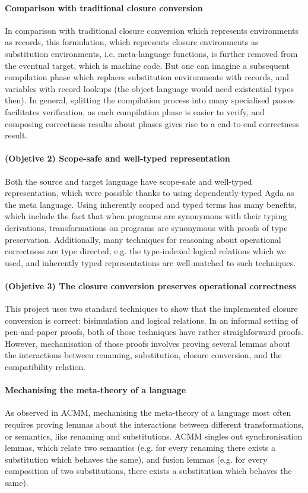 \documentclass[bsc,frontabs,oneside,singlespacing,parskip,deptreport]{infthesis}
\theoremstyle{definition}
\theoremstyle{lemma}
\begin{document}
\paragraph{Comparison with traditional closure conversion}
In comparison with traditional closure conversion which represents
environments as records, this formulation, which represents closure
environments as substitution environments, i.e. meta-language
functions, is further removed from the eventual target, which is
machine code. But one can imagine a subsequent compilation phase which
replaces substitution environments with records, and variables with
record lookups (the object language would need existential types
then). In general, splitting the compilation process into many
specialised passes facilitates verification, as each compilation phase
is easier to verify, and composing correctness results about phases
gives rise to a end-to-end correctness result.

\paragraph{(Objetive 2) Scope-safe and well-typed representation}
Both the source and target language have scope-safe and well-typed
representation, which were possible thanks to using dependently-typed
Agda as the meta language. Using inherently scoped and typed terms has
many benefits, which include the fact that when programs are synonymous
with their typing derivations, transformations on programs are
synonymous with proofs of type preservation. Additionally, many
techniques for reasoning about operational correctness are type
directed, e.g. the type-indexed logical relations which we used, and
inherently typed representations are well-matched to such techniques.

\paragraph{(Objetive 3) The closure conversion preserves operational correctness}
This project uses two standard techniques to show that the implemented
closure conversion is correct: bisimulation and logical relations. In
an informal setting of pen-and-paper proofs, both of those techniques
have rather straighforward proofs. However, mechanisation of those
proofs involves proving several lemmas about the interactions between
renaming, substitution, closure conversion, and the compatibility
relation.

\paragraph{Mechanising the meta-theory of a language}
As observed in ACMM, mechanising the meta-theory of a language most
often requires proving lemmas about the interactions between different
transformations, or semantics, like renaming and substitutions. ACMM
singles out synchronisation lemmas, which relate two semantics
(e.g. for every renaming there exists a substitution which behaves the
same), and fusion lemmas (e.g. for every composition of two
substitutions, there exists a substitution which behaves the
same). 
\end{document}
